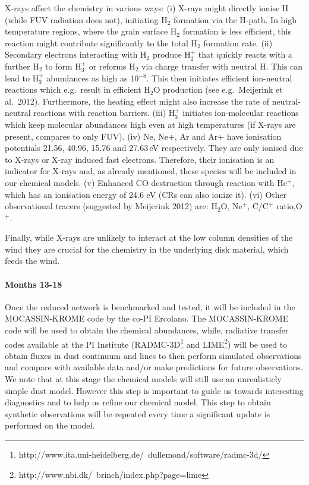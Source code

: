 \documentclass[10pt,fleqn,twoside]{article}
\begin{document}
X-rays affect the chemistry in various ways: (i) X-rays might directly ionise H (while FUV radiation does not), initiating H$_2$ formation via the H-path. In high temperature regions, where the grain surface H$_2$ formation is less efficient, this reaction might contribute significantly to the total H$_2$ formation rate. (ii) Secondary electrons interacting with H$_2$ produce H$_2^+$ that quickly reacts with a further H$_2$ to form H$_3^+$ or reforms H$_2$ via charge transfer with neutral H. This can lead to H$_3^+$ abundances as high as 10$^{-8}$. This then initiates efficient ion-neutral reactions which e.g.\ result in efficient H$_2$O production (see e.g.\ Meijerink et al.\ 2012). Furthermore, the heating effect might also increase the rate of neutral-neutral reactions with reaction barriers. (iii) H$_3^+$ initiates ion-molecular reactions which keep molecular abundances high even at high temperatures (if X-rays are present, compares to only FUV). (iv)
Ne, Ne+, Ar and Ar+ have ionisation potentials 21.56, 40.96, 15.76 and 27.63\,eV respectively. They are only ionised due to X-rays or X-ray induced fast electrons. Therefore, their ionisation is an indicator for X-rays and, as already mentioned, these species will be included in our chemical models. (v) Enhanced CO destruction through reaction with He$^+$, which has an ionisation energy of 24.6 eV (CRs can also ionize it). (vi) Other observational tracers (suggested by Meijerink 2012) are: H$_2$O, Ne$^+$, C/C$^+$ ratio,O$^+$.

Finally, while X-rays are unlikely to interact at the low column densities of the wind they are crucial for the chemistry in the underlying disk material, which feeds the wind. 

\paragraph{ Months 13-18}

 Once the reduced network is benchmarked and tested, it will be included in the MOCASSIN-KROME code by the co-PI Ercolano. The MOCASSIN-KROME code will be used to obtain the chemical abundances, while, radiative transfer codes available at the PI Institute (RADMC-3D\footnote{http://www.ita.uni-heidelberg.de/~dullemond/software/radmc-3d/} and LIME\footnote{http://www.nbi.dk/~brinch/index.php?page=lime}) will be used to obtain fluxes in dust continuum and lines to then perform simulated observations and compare with available data and/or make predictions for future observations. We note that at this stage the chemical models will still use an unrealisticly simple dust model. However this step is important to guide us towards interesting diagnostics and to help us refine our chemical model. This step to obtain synthetic observations will be repeated every time a significant update is performed on the model. 
\end{document}
